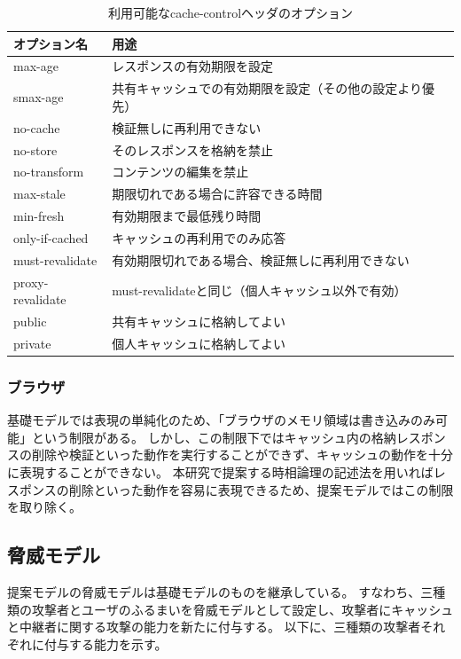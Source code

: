 \documentclass[12pt,a4paper]{jbook}
\begin{document}
\begin{table}[htb]
\centering
\caption{利用可能なcache-controlヘッダのオプション}
\label{tb:CacheControlOption}
\begin{tabular}{ll}
\hline
オプション名 & 用途 \\
\hline
max-age & レスポンスの有効期限を設定 \\
smax-age & 共有キャッシュでの有効期限を設定（その他の設定より優先） \\
no-cache & 検証無しに再利用できない \\
no-store & そのレスポンスを格納を禁止 \\
no-transform & コンテンツの編集を禁止 \\
max-stale & 期限切れである場合に許容できる時間 \\
min-fresh & 有効期限まで最低残り時間 \\
only-if-cached & キャッシュの再利用でのみ応答 \\
must-revalidate & 有効期限切れである場合、検証無しに再利用できない \\
proxy-revalidate & must-revalidateと同じ（個人キャッシュ以外で有効） \\
public & 共有キャッシュに格納してよい \\
private & 個人キャッシュに格納してよい \\
\hline
\end{tabular}
\end{table}

\subsubsection{ブラウザ}
基礎モデルでは表現の単純化のため、「ブラウザのメモリ領域は書き込みのみ可能」という制限がある。
しかし、この制限下ではキャッシュ内の格納レスポンスの削除や検証といった動作を実行することができず、キャッシュの動作を十分に表現することができない。
本研究で提案する時相論理の記述法を用いればレスポンスの削除といった動作を容易に表現できるため、提案モデルではこの制限を取り除く。

\subsection{脅威モデル}
提案モデルの脅威モデルは基礎モデルのものを継承している。
すなわち、三種類の攻撃者とユーザのふるまいを脅威モデルとして設定し、攻撃者にキャッシュと中継者に関する攻撃の能力を新たに付与する。
以下に、三種類の攻撃者それぞれに付与する能力を示す。
\end{document}
